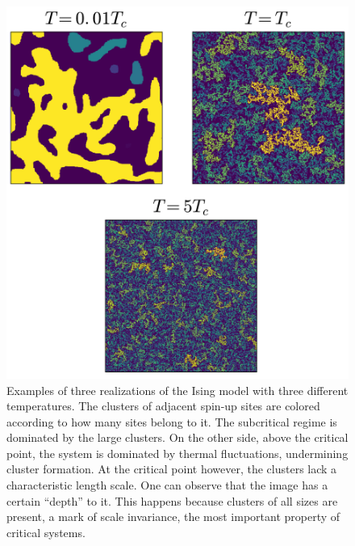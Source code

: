 \begin{figure}
\begin{center}
    \includegraphics[scale=0.6]{chapters/ch2-crit/figs/ising}
\end{center}
\caption{Examples of three realizations of the Ising model with three different
    temperatures. The clusters of adjacent spin-up sites are colored according
    to how many sites belong to it. The subcritical regime is dominated by the
    large clusters. On the other side, above the critical point, the system is
    dominated by thermal fluctuations, undermining cluster formation. At the
    critical point however, the clusters lack a characteristic length scale.
    One can observe that the image has a certain ``depth'' to it. This happens
    because clusters of all sizes are present, a mark of scale invariance,
    the most important property of critical systems.}
\label{fig:bacteria}
\end{figure}

